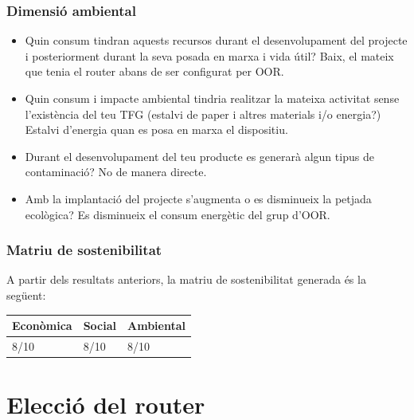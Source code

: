 \documentclass[11pt]{article}
\begin{document}
\subsubsection{Dimensió ambiental}
\begin{itemize}
\item Quin consum tindran aquests recursos durant el desenvolupament del projecte i posteriorment durant la seva posada en marxa i vida útil? Baix, el mateix que tenia el router abans de ser configurat per OOR.
\item Quin consum i impacte ambiental tindria realitzar la mateixa activitat sense l'existència del teu TFG (estalvi de paper i altres materials i/o energia?) Estalvi d’energia quan es posa en marxa el dispositiu.
\item Durant el desenvolupament del teu producte es generarà algun tipus de contaminació? No de manera directe.
\item Amb la implantació del projecte s'augmenta o es disminueix la petjada ecològica? Es disminueix el consum energètic del grup d’OOR.
\end{itemize}
\subsubsection{Matriu de sostenibilitat}
A partir dels resultats anteriors, la matriu de sostenibilitat generada és la següent:
\begin{center}
	\begin{tabular}{| l | l | l |}
		\hline
		Econòmica & Social & Ambiental \\ \hline
		8/10 & 8/10 & 8/10\\ \hline
	\end{tabular}
\end{center}

\section{Elecció del router}
\end{document}
